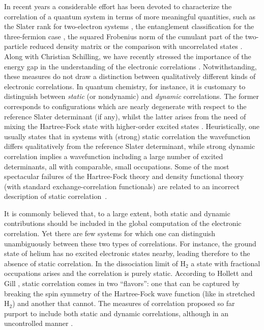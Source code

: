 \documentclass[aps,twocolumn,showpacs,pra,superscriptaddress,floatfix,longbibliography]{revtex4-1}
\newcommand{\7}{\dagger}
\begin{document}
In recent years a 
considerable effort has been devoted to 
characterize the correlation of a quantum system in terms 
of more meaningful quantities, such as the Slater rank for 
two-electron systems \cite{Cirac, Plastino}, the entanglement 
classification for the three-fermion case \cite{Magyares}, the 
squared Frobenius norm of the cumulant part of the two-particle 
reduced density matrix \cite{Mazziotticorr} or the comparison 
with uncorrelated states \cite{PhysRevLett.95.123003}.  
Along with Christian Schilling, we have recently stressed the 
importance of the energy gap in the understanding of the 
electronic correlations \cite{newpaper}. Notwithstanding, 
these measures do not draw a distinction between 
qualitatively different kinds of electronic correlations. In 
quantum chemistry, for instance, it is customary to
distinguish between \textit{static} (or nondynamic) and
\textit{dynamic} correlations. The former corresponds to
configurations which are nearly degenerate with respect to the
reference Slater determinant (if any), whilst the latter arises 
from the need of mixing the Hartree-Fock state with higher-order excited 
states \cite{Becke, Ziesche}. Heuristically, one usually states 
that in systems with (strong) static correlation the wavefunction differs qualitatively from the reference Slater determinant, while strong 
dynamic correlation implies a wavefunction including a large 
number of excited determinants, all with comparable, small 
occupations. Some of the most spectacular failures of the 
Hartree-Fock theory and density functional theory 
(with standard exchange-correlation functionals) are 
related to an incorrect description of static correlation~\cite{Cohen792}. 

It is commonly believed that, to a large extent, both static and 
dynamic contributions should be included in the global computation 
of the electronic correlation. Yet there are few systems for which 
one can distinguish unambiguously between these two types
of correlations. For instance, the ground state of helium has 
no excited electronic states nearby, leading therefore to the 
absence of static correlation. In the dissociation limit of 
H$_2$ a state with fractional occupations arises 
 \cite{Sanchez} and the correlation is purely static. 
According to Hollett and Gill \cite{Hollett}, static correlation 
comes in two ``flavors'': one that can be captured by breaking
the spin symmetry of the Hartree-Fock wave function 
(like in stretched H$_2$) and another that cannot. The 
measures of correlation proposed so far purport to include 
both static and dynamic 
correlations, although in an uncontrolled manner \cite{cumulant}. 
\end{document}
